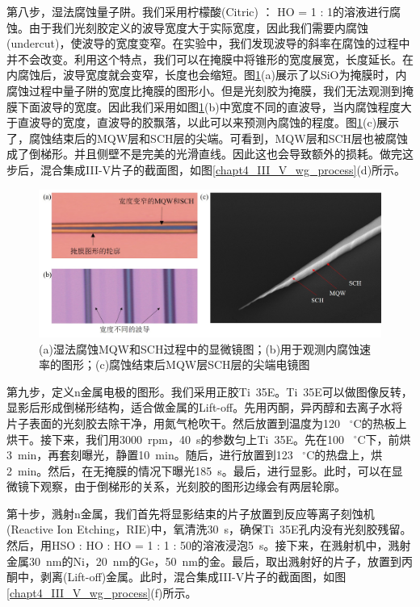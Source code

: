 第八步，湿法腐蚀量子阱。我们采用柠檬酸(Citric) ： HO = 1 : 1的溶液进行腐蚀。由于我们光刻胶定义的波导宽度大于实际宽度，因此我们需要内腐蚀(undercut)，使波导的宽度变窄。在实验中，我们发现波导的斜率在腐蚀的过程中并不会改变。利用这个特点，我们可以在掩膜中将锥形的宽度展宽，长度延长。在内腐蚀后，波导宽度就会变窄，长度也会缩短。图\ref{chapt4_III_V_undercut_MQW}(a)展示了以SiO为掩膜时，内腐蚀过程中量子阱的宽度比掩膜的图形小。但是光刻胶为掩膜，我们无法观测到掩膜下面波导的宽度。因此我们采用如图\ref{chapt4_III_V_undercut_MQW}(b)中宽度不同的直波导，当内腐蚀程度大于直波导的宽度，直波导的胶飘落，以此可以来预测內腐蚀的程度。图\ref{chapt4_III_V_undercut_MQW}(c)展示了，腐蚀结束后的MQW层和SCH层的尖端。可看到，MQW层和SCH层也被腐蚀成了倒梯形。并且侧壁不是完美的光滑直线。因此这也会导致额外的损耗。做完这步后，混合集成III-V片子的截面图，如图\ref{chapt4_III_V_wg_process}(d)所示。
\begin{figure}[!h]
	\centering
	\includegraphics[width=14cm]{./Pictures/chapt4_III_V_undercut_MQW.jpg}
	\caption{(a)湿法腐蚀MQW和SCH过程中的显微镜图；(b)用于观测内腐蚀速率的图形；(c)腐蚀结束后MQW层SCH层的尖端电镜图}
	\label{chapt4_III_V_undercut_MQW}
\end{figure}

第九步，定义n金属电极的图形。我们采用正胶Ti~35E。Ti~35E可以做图像反转，显影后形成倒梯形结构，适合做金属的Lift-off。先用丙酮，异丙醇和去离子水将片子表面的光刻胶去除干净，用氮气枪吹干。然后放置到温度为120 ~$^{\circ}$C的热板上烘干。接下来，我们用3000~rpm，40~s的参数匀上Ti~35E。先在100 ~$^{\circ}$C下，前烘3~min，再套刻曝光，静置10~min。随后，进行放置到123 ~$^{\circ}$C的热盘上，烘2~min。然后，在无掩膜的情况下曝光185~s。最后，进行显影。此时，可以在显微镜下观察，由于倒梯形的关系，光刻胶的图形边缘会有两层轮廓。

第十步，溅射n金属，我们首先将显影结束的片子放置到反应等离子刻蚀机(Reactive Ion Etching，RIE)中，氧清洗30~s，确保Ti~35E孔内没有光刻胶残留。然后，用HSO : HO : HO = 1 : 1 : 50的溶液浸泡5~s。接下来，在溅射机中，溅射金属30~nm的Ni，20~nm的Ge，50~nm的金。最后，取出溅射好的片子，放置到丙酮中，剥离(Lift-off)金属。此时，混合集成III-V片子的截面图，如图\ref{chapt4_III_V_wg_process}(f)所示。

